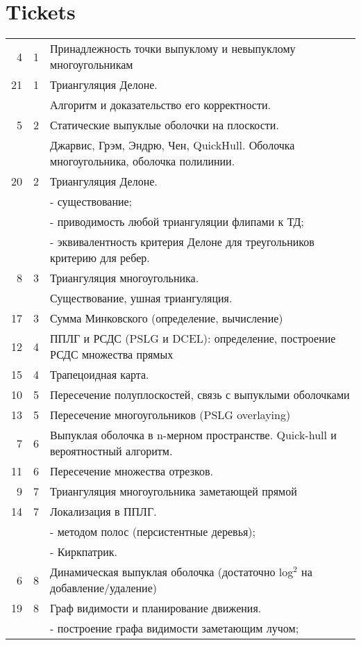 \documentclass[11pt]{article}
\begin{document}
\section{Tickets}
\label{sec-2}
\begin{center}
\begin{tabular}{rrl}
\hline
4 & 1 & Принадлежность точки выпуклому и невыпуклому многоугольникам\\
21 & 1 & Триангуляция Делоне.\\
 &  & Алгоритм и доказательство его корректности.\\
5 & 2 & Статические выпуклые оболочки на плоскости.\\
 &  & Джарвис, Грэм, Эндрю, Чен, QuickHull. Оболочка многоугольника, оболочка полилинии.\\
20 & 2 & Триангуляция Делоне.\\
 &  & - существование;\\
 &  & - приводимость любой триангуляции флипами к ТД;\\
 &  & - эквивалентность критерия Делоне для треугольников критерию для ребер.\\
8 & 3 & Триангуляция многоугольника.\\
 &  & Существование, ушная триангуляция.\\
17 & 3 & Сумма Минковского (определение, вычисление)\\
12 & 4 & ППЛГ и РСДС (PSLG и DCEL): определение, построение РСДС множества прямых\\
15 & 4 & Трапецоидная карта.\\
10 & 5 & Пересечение полуплоскостей, связь с выпуклыми оболочками\\
13 & 5 & Пересечение многоугольников (PSLG overlaying)\\
7 & 6 & Выпуклая оболочка в n-мерном пространстве. Quick-hull и вероятностный алгоритм.\\
11 & 6 & Пересечение множества отрезков.\\
9 & 7 & Триангуляция многоугольника заметающей прямой\\
14 & 7 & Локализация в ППЛГ.\\
 &  & - методом полос (персистентные деревья);\\
 &  & - Киркпатрик.\\
6 & 8 & Динамическая выпуклая оболочка (достаточно log$^{\text{2}}$ на добавление/удаление)\\
19 & 8 & Граф видимости и планирование движения.\\
 &  & - построение графа видимости заметающим лучом;\\

\end{tabular}
\end{center}
\end{document}
